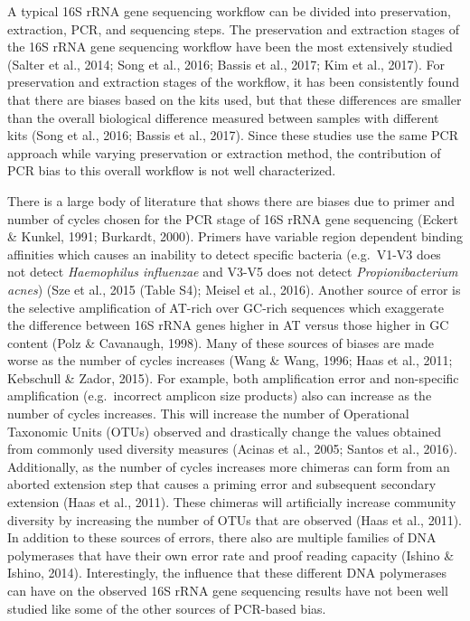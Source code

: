 \documentclass[11pt,]{article}
\begin{document}
A typical 16S rRNA gene sequencing workflow can be divided into
preservation, extraction, PCR, and sequencing steps. The preservation
and extraction stages of the 16S rRNA gene sequencing workflow have been
the most extensively studied (Salter et al., 2014; Song et al., 2016;
Bassis et al., 2017; Kim et al., 2017). For preservation and extraction
stages of the workflow, it has been consistently found that there are
biases based on the kits used, but that these differences are smaller
than the overall biological difference measured between samples with
different kits (Song et al., 2016; Bassis et al., 2017). Since these
studies use the same PCR approach while varying preservation or
extraction method, the contribution of PCR bias to this overall workflow
is not well characterized.

There is a large body of literature that shows there are biases due to
primer and number of cycles chosen for the PCR stage of 16S rRNA gene
sequencing (Eckert \& Kunkel, 1991; Burkardt, 2000). Primers have
variable region dependent binding affinities which causes an inability
to detect specific bacteria (e.g.~V1-V3 does not detect
\emph{Haemophilus influenzae} and V3-V5 does not detect
\emph{Propionibacterium acnes}) (Sze et al., 2015 (Table S4); Meisel et
al., 2016). Another source of error is the selective amplification of
AT-rich over GC-rich sequences which exaggerate the difference between
16S rRNA genes higher in AT versus those higher in GC content (Polz \&
Cavanaugh, 1998). Many of these sources of biases are made worse as the
number of cycles increases (Wang \& Wang, 1996; Haas et al., 2011;
Kebschull \& Zador, 2015). For example, both amplification error and
non-specific amplification (e.g.~incorrect amplicon size products) also
can increase as the number of cycles increases. This will increase the
number of Operational Taxonomic Units (OTUs) observed and drastically
change the values obtained from commonly used diversity measures (Acinas
et al., 2005; Santos et al., 2016). Additionally, as the number of
cycles increases more chimeras can form from an aborted extension step
that causes a priming error and subsequent secondary extension (Haas et
al., 2011). These chimeras will artificially increase community
diversity by increasing the number of OTUs that are observed (Haas et
al., 2011). In addition to these sources of errors, there also are
multiple families of DNA polymerases that have their own error rate and
proof reading capacity (Ishino \& Ishino, 2014). Interestingly, the
influence that these different DNA polymerases can have on the observed
16S rRNA gene sequencing results have not been well studied like some of
the other sources of PCR-based bias.
\end{document}
